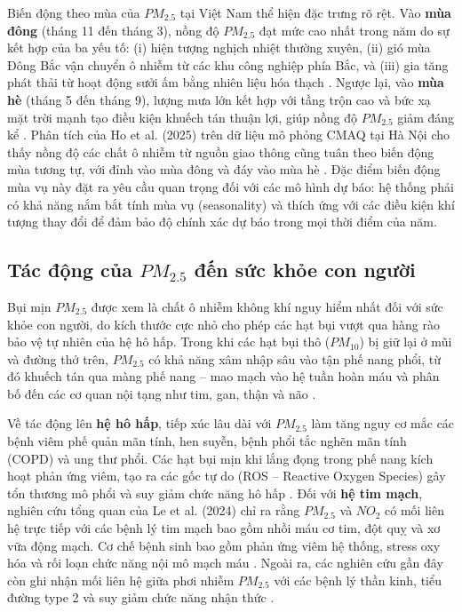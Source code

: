 Biến động theo mùa của $PM_{2.5}$ tại Việt Nam thể hiện đặc trưng rõ rệt. Vào \textbf{mùa đông} (tháng 11 đến tháng 3), nồng độ $PM_{2.5}$ đạt mức cao nhất trong năm do sự kết hợp của ba yếu tố: (i) hiện tượng nghịch nhiệt thường xuyên, (ii) gió mùa Đông Bắc vận chuyển ô nhiễm từ các khu công nghiệp phía Bắc, và (iii) gia tăng phát thải từ hoạt động sưởi ấm bằng nhiên liệu hóa thạch \cite{dam2024pm25, ho2025assessment}. Ngược lại, vào \textbf{mùa hè} (tháng 5 đến tháng 9), lượng mưa lớn kết hợp với tầng trộn cao và bức xạ mặt trời mạnh tạo điều kiện khuếch tán thuận lợi, giúp nồng độ $PM_{2.5}$ giảm đáng kể \cite{dam2024pm25}. Phân tích của Ho et al. (2025) trên dữ liệu mô phỏng CMAQ tại Hà Nội cho thấy nồng độ các chất ô nhiễm từ nguồn giao thông cũng tuân theo biến động mùa tương tự, với đỉnh vào mùa đông và đáy vào mùa hè \cite{ho2025assessment}. Đặc điểm biến động mùa vụ này đặt ra yêu cầu quan trọng đối với các mô hình dự báo: hệ thống phải có khả năng nắm bắt tính mùa vụ (seasonality) và thích ứng với các điều kiện khí tượng thay đổi để đảm bảo độ chính xác dự báo trong mọi thời điểm của năm.

\subsection{Tác động của $PM_{2.5}$ đến sức khỏe con người}

Bụi mịn $PM_{2.5}$ được xem là chất ô nhiễm không khí nguy hiểm nhất đối với sức khỏe con người, do kích thước cực nhỏ cho phép các hạt bụi vượt qua hàng rào bảo vệ tự nhiên của hệ hô hấp. Trong khi các hạt bụi thô ($PM_{10}$) bị giữ lại ở mũi và đường thở trên, $PM_{2.5}$ có khả năng xâm nhập sâu vào tận phế nang phổi, từ đó khuếch tán qua màng phế nang -- mao mạch vào hệ tuần hoàn máu và phân bố đến các cơ quan nội tạng như tim, gan, thận và não \cite{le2024environmental}. 

Về tác động lên \textbf{hệ hô hấp}, tiếp xúc lâu dài với $PM_{2.5}$ làm tăng nguy cơ mắc các bệnh viêm phế quản mãn tính, hen suyễn, bệnh phổi tắc nghẽn mãn tính (COPD) và ung thư phổi. Các hạt bụi mịn khi lắng đọng trong phế nang kích hoạt phản ứng viêm, tạo ra các gốc tự do (ROS -- Reactive Oxygen Species) gây tổn thương mô phổi và suy giảm chức năng hô hấp \cite{le2024environmental}. Đối với \textbf{hệ tim mạch}, nghiên cứu tổng quan của Le et al. (2024) chỉ ra rằng $PM_{2.5}$ và $NO_2$ có mối liên hệ trực tiếp với các bệnh lý tim mạch bao gồm nhồi máu cơ tim, đột quỵ và xơ vữa động mạch. Cơ chế bệnh sinh bao gồm phản ứng viêm hệ thống, stress oxy hóa và rối loạn chức năng nội mô mạch máu \cite{le2024environmental}. Ngoài ra, các nghiên cứu gần đây còn ghi nhận mối liên hệ giữa phơi nhiễm $PM_{2.5}$ với các bệnh lý thần kinh, tiểu đường type 2 và suy giảm chức năng nhận thức \cite{krzyzanowski2014megacities}.

